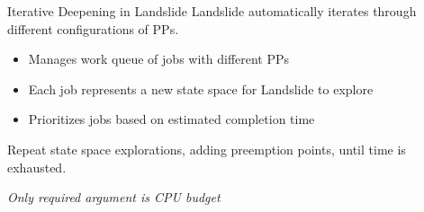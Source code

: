 \documentclass[xcolor=dvipsnames]{beamer}
\begin{document}
%
%

\begin{frame}{Iterative Deepening in Landslide}
	Landslide automatically iterates through different configurations of PPs.
	\begin{itemize}
		\item Manages work queue of jobs with different PPs
		\item Each job represents a new state space for Landslide to explore
		\item Prioritizes jobs based on estimated completion time
	\end{itemize}
	\linegap

	Repeat state space explorations, adding preemption points, until time is exhausted.

	\linegap
	{\em Only required argument is CPU budget}
\end{frame}
\end{document}
